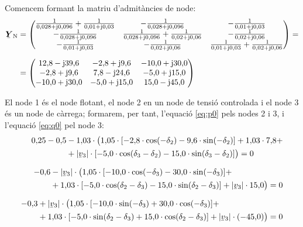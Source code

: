 \begin{exemple}
Comencem formant la matriu d'admit\`{a}ncies de node:
\begin{align*}
\mcmplx{Y}\ped{N} &= \begin{pmatrix}
\frac{1}{0{,}028+\ju0{,}096} + \frac{1}{0{,}01+\ju0{,}03} & -\frac{1}{0{,}028+\ju0{,}096}  &  -\frac{1}{0{,}01+\ju0{,}03}\\
-\frac{1}{0{,}028+\ju0{,}096} & \frac{1}{0{,}028+\ju0{,}096} + \frac{1}{0{,}02+\ju0{,}06} &  -\frac{1}{0{,}02+\ju0{,}06}\\
-\frac{1}{0{,}01+\ju0{,}03} & -\frac{1}{0{,}02+\ju0{,}06} &
\frac{1}{0{,}01+\ju0{,}03} + \frac{1}{0{,}02+\ju0{,}06}
\end{pmatrix} = \\[1.5ex]
 &= \begin{pmatrix}
12{,}8 - \ju 39{,}6 & -2{,}8 + \ju 9{,}6 & -10{,}0 + \ju 30{,}0 \\
-2{,}8 + \ju 9{,}6 & 7{,}8 - \ju 24{,}6 & -5{,}0 + \ju 15{,}0 \\
-10{,}0 + \ju 30{,}0 & -5{,}0 + \ju 15{,}0 & 15{,}0 - \ju 45{,}0
\end{pmatrix}
\end{align*}

El node 1 \'{e}s el node flotant, el node 2 en un node de tensi\'{o}
controlada i el node 3 \'{e}s un node de c\`{a}rrega; formarem, per tant,
l'equaci\'{o} \eqref{eq:p0} pels nodes 2 i 3, i l'equaci\'{o} \eqref{eq:q0}
pel node 3:
\begin{align*}
\begin{split}
0{,}25-0{,}5 &- 1{,}03\cdot \bigl( 1{,}05\cdot [-2{,}8
\cdot\cos(-\delta_2) - 9{,}6
\cdot\sin( -\delta_2)]  + 1{,}03 \cdot 7{,}8 {}+ \\
&+ |\cmplx{v}_3|\cdot [-5{,}0 \cdot\cos(\delta_3-\delta_2) -
15{,}0\cdot \sin(\delta_3-\delta_2)]
 \bigr)  = 0 \end{split} \\[1.5ex]
\begin{split}
-0{,}6 &- |\cmplx{v}_3| \cdot \bigl( 1{,}05\cdot [-10{,}0
\cdot\cos(-\delta_3)
- 30{,}0\cdot\sin(-\delta_3)]  + \\
&+ 1{,}03\cdot [-5{,}0\cdot\cos(\delta_2-\delta_3) -
15{,}0\cdot\sin(\delta_2-\delta_3)]
 + |\cmplx{v}_3| \cdot15{,}0 \bigr)  = 0 \end{split}  \\[1.5ex]
\begin{split}
-0{,}3 &+ |\cmplx{v}_3|\cdot \bigl( 1{,}05
\cdot[-10{,}0\cdot\sin(-\delta_3) +
30{,}0\cdot\cos(-\delta_3)]  + \\
&+ 1{,}03 \cdot[-5{,}0\cdot\sin(\delta_2-\delta_3) +
15{,}0\cdot\cos(\delta_2-\delta_3)] + |\cmplx{v}_3|\cdot (-45{,}0)
\bigr)  = 0 \end{split}
\end{align*}


\end{exemple}
